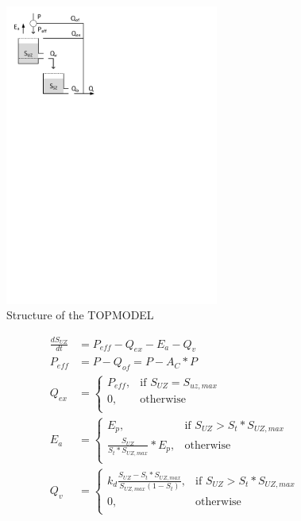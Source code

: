 { 																	%
\begin{figure}
\includegraphics[trim=1cm 21cm 7cm 1cm,width=7cm,keepaspectratio]{./files/14_schematic.pdf}
\caption{Structure of the TOPMODEL} \label{fig:14_schematic}
\end{figure}

\begin{align}
	\frac{dS_{UZ}}{dt} &= P_{eff} - Q_{ex} - E_a - Q_v \\
	P_{eff} &= P - Q_{of} = P - A_C*P\\
	Q_{ex} &= \begin{cases}
		P_{eff}, & \text{if } S_{UZ} = S_{uz,max} \\
		0, & \text{otherwise}\\
	\end{cases}\\
	E_a &= 
	\begin{cases}
		E_p, & \text{if } S_{UZ} > S_t*S_{UZ,max} \\
		\frac{S_{UZ}}{S_t*S_{UZ,max}}*E_p, & \text{otherwise}\\
	\end{cases}\\	
	Q_v &=  
		\begin{cases}
		k_d\frac{S_{UZ} - S_t*S_{UZ,max}}{S_{UZ,max}(1-S_t)}, & \text{if } S_{UZ} > S_t*S_{UZ,max} \\
		0, & \text{otherwise}\\
	\end{cases}
\end{align}

} %
\vspace{0.5cm}

